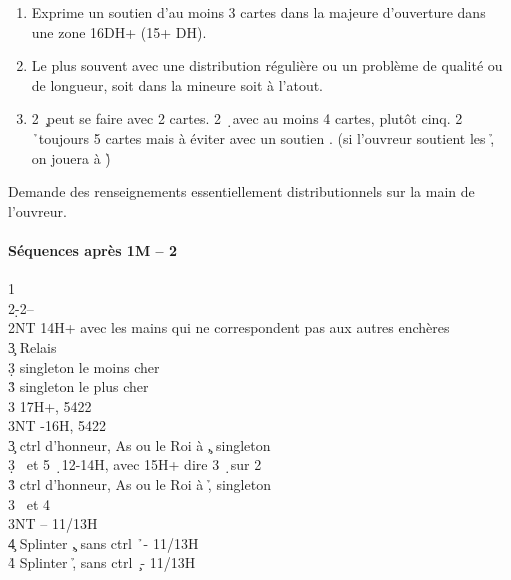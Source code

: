 \documentclass[a4paper]{article}
\begin{document}
\begin{enumerate}
\item Exprime un soutien d’au moins 3 cartes dans la majeure 
d’ouverture dans une zone 16DH+ (15+
DH).

\item Le plus souvent avec une distribution régulière ou un 
problème de qualité ou de longueur, soit dans la mineure soit 
à l’atout.

\item 2 \c\ peut se faire avec 2 cartes.
2 \d\ avec au moins 4 cartes, plutôt cinq.
2 \h\ toujours 5 cartes mais à éviter avec un soutien \s . (si 
l’ouvreur soutient les \h , on jouera à \h )

\end{enumerate}

Demande des renseignements essentiellement distributionnels sur 
la main de l’ouvreur.

\paragraph{Séquences après 1M – 2 \pdfc}

\begin{bidtable}
1\c\\
2\d-2\s--\\
2NT \> 14H+ avec les mains qui ne correspondent pas aux autres enchères\+\\
3\c \> Relais\+\\
3\d \> singleton le moins cher\\
3\h \> singleton le plus cher\\
3\s \> 17H+, 5422\\
3NT -16H, 5422\-\-\\
3\c \> ctrl d’honneur, As ou le Roi à \c , singleton \h \\
3\d {} \s\ et 5 \d\ 12-14H, avec 15H+ dire 3 \d\ sur 2 \c \\
3\h \> ctrl d’honneur, As ou le Roi à \h , singleton \c \\
3\s {} \s\ et 4 \d \\
3NT  – 11/13H\\
4\c \> Splinter \c , sans ctrl \h\ - 11/13H\\
4\h \> Splinter \h , sans ctrl \c\ - 11/13H
\end{bidtable}
\end{document}
